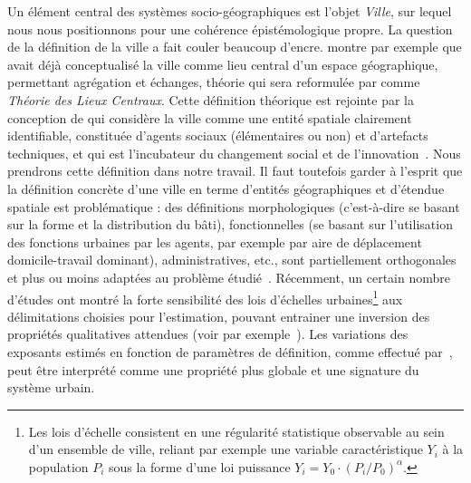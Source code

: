 {Un élément central des systèmes socio-géographiques est l'objet \emph{Ville}, sur lequel nous nous positionnons pour une cohérence épistémologique propre. La question de la définition de la ville a fait couler beaucoup d'encre. \cite{robic1982cent} montre par exemple que  avait déjà conceptualisé la ville comme lieu central d'un espace géographique, permettant agrégation et échanges, théorie qui sera reformulée par  comme \textit{Théorie des Lieux Centraux}. Cette définition théorique est rejointe par la conception de  qui considère la ville comme une entité spatiale clairement identifiable, constituée d'agents sociaux (élémentaires ou non) et d'artefacts techniques, et qui est l'incubateur du changement social et de l'innovation~\cite{pumain2010theorie}. Nous prendrons cette définition dans notre travail. Il faut toutefois garder à l'esprit que la définition concrète d'une ville en terme d'entités géographiques et d'étendue spatiale est problématique : des définitions morphologiques (c'est-à-dire se basant sur la forme et la distribution du bâti), fonctionnelles (se basant sur l'utilisation des fonctions urbaines par les agents, par exemple par aire de déplacement domicile-travail dominant), administratives, etc., sont partiellement orthogonales et plus ou moins adaptées au problème étudié~\cite{guerois2002commune}. Récemment, un certain nombre d'études ont montré la forte sensibilité des lois d'échelles urbaines\footnote{Les lois d'échelle consistent en une régularité statistique observable au sein d'un ensemble de ville, reliant par exemple une variable caractéristique $Y_i$ à la population $P_i$ sous la forme d'une loi puissance $Y_i = Y_0\cdot \left(P_i / P_0\right)^{\alpha}$.} aux délimitations choisies pour l'estimation, pouvant entrainer une inversion des propriétés qualitatives attendues (voir par exemple~\cite{arcaute2015constructing}). Les variations des exposants estimés en fonction de paramètres de définition, comme effectué par~\cite{2015arXiv150707878C}, peut être interprété comme une propriété plus globale et une signature du système urbain.
}




